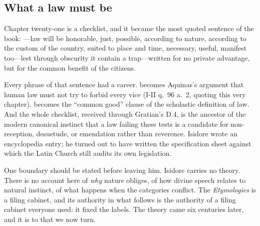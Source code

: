 \subsection{What a law must be}

Chapter twenty-one is a checklist, and it became the most quoted sentence of the book: ---law will be honorable, just, possible, according to nature, according to the custom of the country, suited to place and time, necessary, useful, manifest too---lest through obscurity it contain a trap---written for no private advantage, but for the common benefit of the citizens.

Every phrase of that sentence had a career.  becomes Aquinas's argument that human law must not try to forbid every vice (I-II q.~96 a.~2, quoting this very chapter).  becomes the ``common good'' clause of the scholastic definition of law. And the whole checklist, received through Gratian's D.4, is the ancestor of the modern canonical instinct that a law failing these tests is a candidate for non-reception, desuetude, or emendation rather than reverence. Isidore wrote an encyclopedia entry; he turned out to have written the specification sheet against which the Latin Church still audits its own legislation.

One boundary should be stated before leaving him. Isidore carries no theory. There is no account here of \emph{why} nature obliges, of how divine speech relates to natural instinct, of what happens when the categories conflict. The \emph{Etymologies} is a filing cabinet, and its authority in what follows is the authority of a filing cabinet everyone used: it fixed the labels. The theory came six centuries later, and it is to that we now turn.
